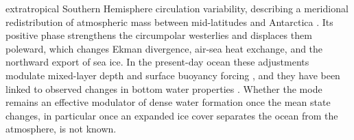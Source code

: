 \documentclass[pdflatex,sn-nature]{sn-jnl}
\begin{document}
extratropical Southern Hemisphere circulation variability, describing a meridional redistribution of atmospheric mass between mid-latitudes and Antarctica \cite{Marshall2003,Thompson2000}. Its positive phase strengthens the circumpolar westerlies and displaces them poleward, which changes Ekman divergence, air-sea heat exchange, and the northward export of sea ice. In the present-day ocean these adjustments modulate mixed-layer depth and surface buoyancy forcing \cite{Sallee2010}, and they have been linked to observed changes in bottom water properties \cite{Zhou2023,Silvano2020}. Whether the mode remains an effective modulator of dense water formation once the mean state changes, in particular once an expanded ice cover separates the ocean from the atmosphere, is not known.

\end{document}
